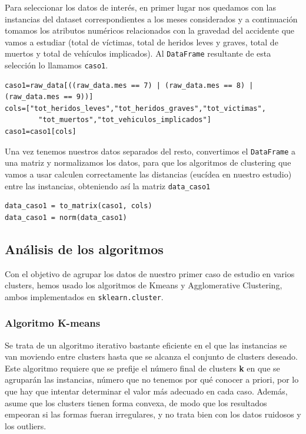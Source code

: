 \documentclass[a4paper,11pt]{book}
\begin{document}
Para seleccionar los datos de interés, en primer lugar nos quedamos con las instancias del dataset correspondientes a los meses considerados y a continuación tomamos los atributos numéricos relacionados con la gravedad del accidente que vamos a estudiar (total de víctimas, total de heridos leves y graves, total de muertos y total de vehículos implicados). Al \texttt{DataFrame} resultante de esta selección lo llamamos \texttt{caso1}.

\begin{verbatim}
caso1=raw_data[((raw_data.mes == 7) | (raw_data.mes == 8) | (raw_data.mes == 9))]
cols=["tot_heridos_leves","tot_heridos_graves","tot_victimas",
		"tot_muertos","tot_vehiculos_implicados"]
caso1=caso1[cols]
\end{verbatim}
 Una vez tenemos nuestros datos separados del resto, convertimos el \texttt{DataFrame} a una matriz y normalizamos los datos, para que los algoritmos de clustering que vamos a usar calculen correctamente las distancias (eucídea en nuestro estudio) entre las instancias, obteniendo así la matriz \texttt{data_caso1}
\begin{verbatim}
data_caso1 = to_matrix(caso1, cols)
data_caso1 = norm(data_caso1)
\end{verbatim}

\subsection{Análisis de los algoritmos}

Con el objetivo de agrupar los datos de nuestro primer caso de estudio en varios clusters, hemos usado los algoritmos de Kmeans y Agglomerative Clustering, ambos implementados en \texttt{sklearn.cluster}. 
\subsubsection{Algoritmo K-means}
Se trata de un algoritmo iterativo bastante eficiente en el que las instancias se van moviendo entre clusters hasta que se alcanza el conjunto de clusters deseado. Este algoritmo requiere que se prefije el número final de clusters \textbf{k} en que se agruparán las instancias, número que no tenemos por qué conocer a priori, por lo que hay que intentar determinar el valor más adecuado en cada caso. Además, asume que los clusters tienen forma convexa, de modo que los resultados empeoran si las formas fueran irregulares, y no trata bien con los datos ruidosos y los outliers. 
\end{document}
